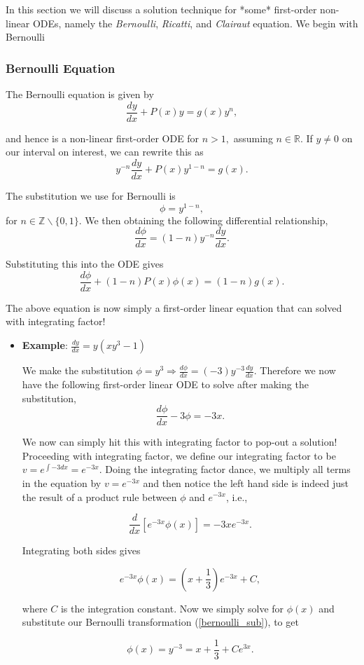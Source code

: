 In this section we will discuss a solution technique for *some* first-order non-linear ODEs, namely the \emph{Bernoulli}, \emph{Ricatti}, and \emph{Clairaut} equation. We begin with Bernoulli

%
%
\subsubsection{Bernoulli Equation}

The Bernoulli equation is given by
\begin{equation}
\label{bernoulli} \frac{dy}{dx} + P(x)y = g(x) y^n,
\end{equation}

and hence is a non-linear first-order ODE for $n>1,$ assuming $n\in\mathbb{R}.$ If $y\neq0$ on our interval on interest, we can rewrite this as 
$$y^{-n}\frac{dy}{dx} + P(x) y^{1-n} = g(x).$$

The substitution we use for Bernoulli is
\begin{equation}
\label{bernoulli_sub} \phi = y^{1-n},
\end{equation}
for $n\in\mathbb{Z}\backslash \{0,1\}$. We then obtaining the following differential relationship,
$$\frac{d\phi}{dx} = (1-n)y^{-n} \frac{dy}{dx}.$$

Substituting this into the ODE gives
$$\frac{d\phi}{dx} + (1-n)P(x)\phi(x) = (1-n) g(x).$$

The above equation is now simply a first-order linear equation that can solved with integrating factor!

\begin{itemize}
\item {\bf{Example}}: $\frac{dy}{dx} = y(xy^3 - 1)$

We make the substitution $\phi = y^{3} \Rightarrow \frac{d\phi}{dx} = (-3) y^{-3} \frac{dy}{dx}.$ Therefore we now have the following first-order linear ODE to solve after making the substitution,
$$\frac{d\phi}{dx} - 3\phi = -3x.$$

We now can simply hit this with integrating factor to pop-out a solution! Proceeding with integrating factor, we define our integrating factor to be $v = e^{\int -3 dx} = e^{-3x}.$ Doing the integrating factor dance, we multiply all terms in the equation by $v=e^{-3x}$ and then notice the left hand side is indeed just the result of a product rule between $\phi$ and $e^{-3x}$, i.e.,

$$\frac{d}{dx} \left[ e^{-3x} \phi(x) \right] =-3x e^{-3x}.$$

Integrating both sides gives

$$e^{-3x}\phi(x) = (x + \frac{1}{3})e^{-3x} + C,$$

where $C$ is the integration constant. Now we simply solve for $\phi(x)$ and substitute our Bernoulli transformation (\ref{bernoulli_sub}), to get

$$\phi(x) = y^{-3} = x + \frac{1}{3} + Ce^{3x}.$$

\end{itemize}



